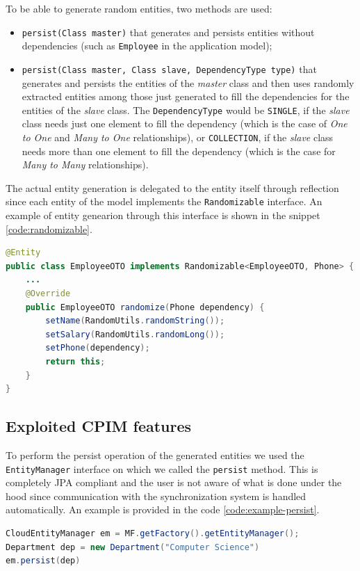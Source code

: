 \noindent To be able to generate random entities, two methods are used:
\begin{itemize}
\item \texttt{persist(Class master)} that generates and persists entities without dependencies (such as \texttt{Employee} in the application model);
\item \texttt{persist(Class master, Class slave, DependencyType type)} that generates and persists the entities of the \textit{master} class and then uses randomly extracted entities among those just generated to fill the dependencies for the entities of the \textit{slave} class.
The \texttt{DependencyType} would be \texttt{SINGLE}, if the \textit{slave} class needs just one element to fill the dependency (which is the case of \textit{One to One} and \textit{Many to One} relationships), or \texttt{COLLECTION}, if the \textit{slave} class needs more than one element to fill the dependency (which is the case for \textit{Many to Many} relationships).
\end{itemize}

\noindent The actual entity generation is delegated to the entity itself through reflection since each entity of the model implements the \texttt{Randomizable} interface.
An example of entity genearion through this interface is shown in the snippet \ref{code:randomizable}.

\begin{lstlisting}[language=Java, caption=Entities generation, label=code:randomizable]
@Entity
public class EmployeeOTO implements Randomizable<EmployeeOTO, Phone> {
    ...
    @Override
    public EmployeeOTO randomize(Phone dependency) {
        setName(RandomUtils.randomString());
        setSalary(RandomUtils.randomLong());
        setPhone(dependency);
        return this;
    }
}
\end{lstlisting}
 
\subsection{Exploited CPIM features}
To perform the persist operation of the generated entities we used the \texttt{EntityManager} interface on which we called the \texttt{persist} method. This is completely JPA compliant and the user is not aware of what is done under the hood since communication with the synchronization system is handled automatically. An example is provided in the code \ref{code:example-persist}.

\begin{lstlisting}[language=Java, caption=Persisting entities in CPIM, label=code:example-persist]
CloudEntityManager em = MF.getFactory().getEntityManager();
Department dep = new Department("Computer Science")
em.persist(dep)
\end{lstlisting}

